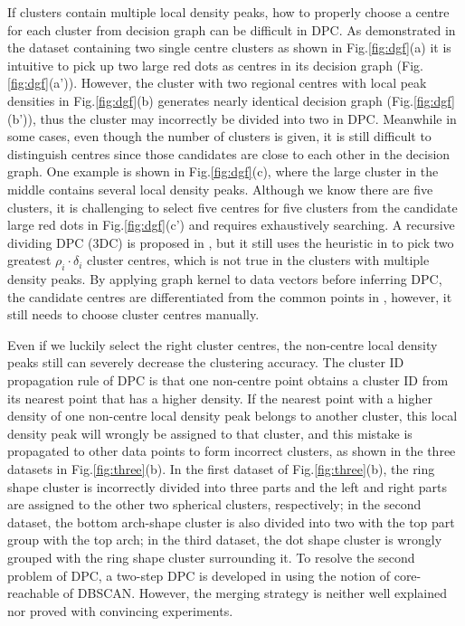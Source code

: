 \documentclass{llncs}
\begin{document}
If clusters contain multiple local density peaks, how to properly choose a centre for each cluster from decision graph can be difficult in DPC. As demonstrated in the dataset containing two single centre clusters as shown in Fig.\ref{fig:dgf}(a) it is intuitive to pick up two large red dots as centres in its decision graph (Fig.\ref{fig:dgf}(a')). However, the cluster with two regional centres with local peak densities in Fig.\ref{fig:dgf}(b) generates nearly identical decision graph (Fig.\ref{fig:dgf}(b')), thus the cluster may incorrectly be divided into two in DPC. 
Meanwhile in some cases, even though the number of clusters is given, it is still difficult to distinguish centres since those candidates are close to each other in the decision graph. One example is shown in Fig.\ref{fig:dgf}(c), where the large cluster in the middle contains several local density peaks. Although we know there are five clusters, it is challenging to select five centres for five clusters from the candidate large red dots in Fig.\ref{fig:dgf}(c') and requires exhaustively searching.
A recursive dividing DPC (3DC) is proposed in \cite{dgf}, but it still uses the heuristic in \cite{dp} to pick two greatest $\rho_{i}\cdot\delta_{i}$ cluster centres, which is not true in the clusters with multiple density peaks. By applying graph kernel to data vectors before inferring DPC, the candidate centres are differentiated from the common points in \cite{pakdd}, however, it still needs to choose cluster centres manually.

Even if we luckily select the right cluster centres, the non-centre local density peaks still can severely decrease the clustering accuracy. The cluster ID propagation rule of DPC is that one non-centre point obtains a cluster ID from its nearest point that has a higher density. If the nearest point with a higher density of one non-centre local density peak belongs to another cluster, this local density peak will wrongly be assigned to that cluster, and this mistake is propagated to other data points to form incorrect clusters, as shown in the three datasets in Fig.\ref{fig:three}(b). In the first dataset of Fig.\ref{fig:three}(b), the ring shape cluster is incorrectly divided into three parts and the left and right parts are assigned to the other two spherical clusters, respectively; in the second dataset, the bottom arch-shape cluster is also divided into two with the top part group with the top arch; in the third dataset, the dot shape cluster is wrongly grouped with the ring shape cluster surrounding it. 
To resolve the second problem of DPC, a two-step DPC is developed in \cite{knowledgebase2017} using the notion of core-reachable of DBSCAN. However, the merging strategy is neither well explained nor proved with convincing experiments.
%
\end{document}
